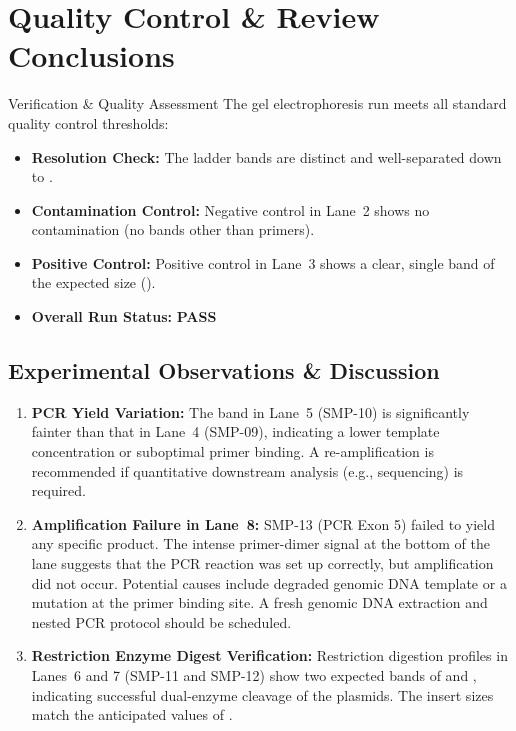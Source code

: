\section{Quality Control \& Review Conclusions}

\begin{qcbox}{Verification \& Quality Assessment}
\small
The gel electrophoresis run meets all standard quality control thresholds:
\begin{itemize}[leftmargin=1.0em,itemsep=1.5pt]
  \item \textbf{Resolution Check:} The ladder bands are distinct and well-separated down to .
  \item \textbf{Contamination Control:} Negative control in Lane~2 shows no contamination (no bands other than primers).
  \item \textbf{Positive Control:} Positive control in Lane~3 shows a clear, single band of the expected size ().
  \item \textbf{Overall Run Status:} \textcolor{PassGreen}{\textbf{PASS}}
\end{itemize}
\end{qcbox}

\medskip
\subsection*{Experimental Observations \& Discussion}
\begin{enumerate}[leftmargin=1.2em,itemsep=2.0pt]
  \item \textbf{PCR Yield Variation:} The band in Lane~5 (SMP-10) is significantly fainter than that in Lane~4 (SMP-09), indicating a lower template concentration or suboptimal primer binding. A re-amplification is recommended if quantitative downstream analysis (e.g., sequencing) is required.
  \item \textbf{Amplification Failure in Lane~8:} SMP-13 (PCR Exon 5) failed to yield any specific product. The intense primer-dimer signal at the bottom of the lane suggests that the PCR reaction was set up correctly, but amplification did not occur. Potential causes include degraded genomic DNA template or a mutation at the primer binding site. A fresh genomic DNA extraction and nested PCR protocol should be scheduled.
  \item \textbf{Restriction Enzyme Digest Verification:} Restriction digestion profiles in Lanes~6 and 7 (SMP-11 and SMP-12) show two expected bands of  and , indicating successful dual-enzyme cleavage of the plasmids. The insert sizes match the anticipated values of  \cite{Aaij1972}.
\end{enumerate}

